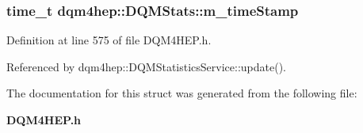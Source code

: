 \subsubsection[{m\+\_\+time\+Stamp}]{\setlength{\rightskip}{0pt plus 5cm}time\+\_\+t dqm4hep\+::\+D\+Q\+M\+Stats\+::m\+\_\+time\+Stamp}\label{structdqm4hep_1_1DQMStats_af90993e4bbd389ba2ed4288eb42ee4b0}


Definition at line 575 of file D\+Q\+M4\+H\+E\+P.\+h.



Referenced by dqm4hep\+::\+D\+Q\+M\+Statistics\+Service\+::update().



The documentation for this struct was generated from the following file\+:\begin{DoxyCompactItemize}
\item 
{\bf D\+Q\+M4\+H\+E\+P.\+h}\end{DoxyCompactItemize}
